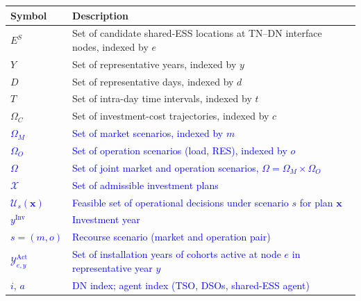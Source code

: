 \documentclass[preprint,12pt]{elsarticle}
\begin{document}
\begingroup
    \footnotesize
    \setlength{\LTpre}{0pt}
    \setlength{\LTpost}{0pt}
    \begin{longtable}{@{}>{\raggedright\arraybackslash}p{} >{\raggedright\arraybackslash}p{}@{}}
        \toprule
        \textbf{Symbol} & \textbf{Description} \\
        \midrule
        \endhead
        \midrule
        \endfoot
        \bottomrule
        \endlastfoot
        $E^S$       & Set of candidate shared-ESS locations at TN–DN interface nodes, indexed by $e$ \\
        $Y$         & Set of representative years, indexed by $y$ \\
        $D$         & Set of representative days, indexed by $d$ \\
        $T$         & Set of intra-day time intervals, indexed by $t$ \\
        $\Omega_C$  & Set of investment-cost trajectories, indexed by $c$ \\
        \textcolor{blue}{$\Omega_M$}  & \textcolor{blue}{Set of market scenarios, indexed by $m$} \\
        \textcolor{blue}{$\Omega_O$}  & \textcolor{blue}{Set of operation scenarios (load, RES), indexed by $o$} \\
        \textcolor{blue}{$\Omega$} & \textcolor{blue}{Set of joint market and operation scenarios, $\Omega=\Omega_M\times\Omega_O$} \\     
        \textcolor{blue}{$\mathcal{X}$} & \textcolor{blue}{Set of admissible investment plans} \\
        \textcolor{blue}{$\mathcal{U}_s(\boldsymbol{x})$} & \textcolor{blue}{Feasible set of operational decisions under scenario $s$ for plan $\boldsymbol{x}$} \\
        \textcolor{blue}{$y^{\text{Inv}}$} & \textcolor{blue}{Investment year} \\
        \textcolor{blue}{$s = (m,o)$} & \textcolor{blue}{Recourse scenario (market and operation pair)} \\
        \textcolor{blue}{$\mathcal{Y}^{\text{Act}}_{e,y}$} & \textcolor{blue}{Set of installation years of cohorts active at node $e$ in representative year $y$} \\
        \textcolor{blue}{$i$, $a$} & \textcolor{blue}{DN index; agent index (TSO, DSOs, shared-ESS agent)} \\
    \end{longtable}
    \addtocounter{table}{-1}
\endgroup
\end{document}
